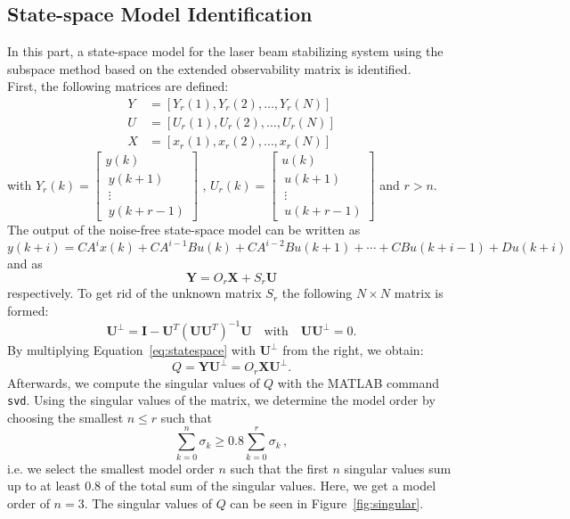 \subsection{State-space Model Identification}
In this part, a state-space model for the laser beam stabilizing system using the subspace method based on the extended observability matrix is identified. \\
First, the following matrices are defined: 
\begin{align}
 Y &= \left[Y_r(1), Y_r(2),\ldots,Y_r(N) \right] \\
 U &= \left[U_r(1), U_r(2),\ldots,U_r(N) \right] \\
 X &= \left[x_r(1), x_r(2),\ldots,x_r(N) \right]
\end{align}
with 
\quad $Y_r(k) = \left[ \begin{array}{c} y(k) \\\ y(k+1) \\\ \vdots \\\ y(k + r -1) \end{array}\right] $ , \quad $U_r(k) = \left[ \begin{array}{c} u(k) \\\ u(k+1) \\\ \vdots \\\ u(k + r -1) \end{array}\right] $ \quad and \quad $r > n $.\\
The output of the noise-free state-space model can be written as
\begin{equation}
y(k+i) = CA^{i}x(k) + CA^{i-1}Bu(k) + CA^{i-2}Bu(k+1) + \cdots + CBu(k+i-1) + Du(k+i)
\end{equation}
and as 
\begin{equation}
\textbf{Y} = O_r \textbf{X} + S_r \textbf{U}
\label{eq:statespace}
\end{equation}
respectively. 
To get rid of the unknown matrix $S_r$ the following $ N \times N $ matrix is formed: 
\begin{equation}
\textbf{U}^{\bot} = \textbf{I} - \textbf{U}^{T}(\textbf{U}\textbf{U}^{T})^{-1}\textbf{U} \quad \text{with} \quad \textbf{U}\textbf{U}^{\bot} = 0.
\end{equation}
By multiplying Equation~\ref{eq:statespace} with $\textbf{U}^{\bot}$ from the right, we obtain:
\begin{equation}
	Q = \textbf{Y}\textbf{U}^{\bot} = O_r\textbf{X}\textbf{U}^{\bot}.
\end{equation}
Afterwards, we compute the singular values of $Q$ with the MATLAB command \texttt{svd}. 
Using the singular values of the matrix, we determine the model order by choosing the smallest $n \le r$ such that
\begin{equation}
	\sum\limits_{k=0}^{n}\sigma_k \ge 0.8\sum\limits_{k=0}^{r}\sigma_k\, ,
\end{equation}
i.e. we select the smallest model order $n$ such that the first $n$ singular values sum up to at least $0.8$ of the total sum of the singular values.
Here, we get a model order of $n = 3$.
The singular values of $Q$ can be seen in Figure~\ref{fig:singular}. 

